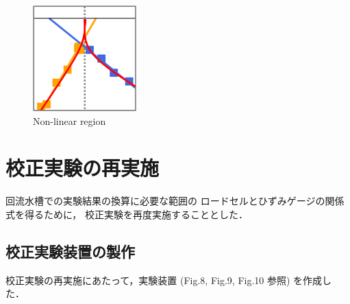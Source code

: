 \documentclass[twocolumn,a4j]{jsarticle}
\begin{document}
\begin{figure}[htbp]
    \footnotesize
    \begin{center}
        \includegraphics[width=40mm]{../images/image_10.png}
        \caption{Non-linear region}
    \end{center}
\end{figure}

\newpage
\section{校正実験の再実施}
回流水槽での実験結果の換算に必要な範囲の
ロードセルとひずみゲージの関係式を得るために，
校正実験を再度実施することとした．\\

\subsection{校正実験装置の製作}

校正実験の再実施にあたって，実験装置 (Fig.8, Fig.9, Fig.10 参照) を作成した．
\end{document}
